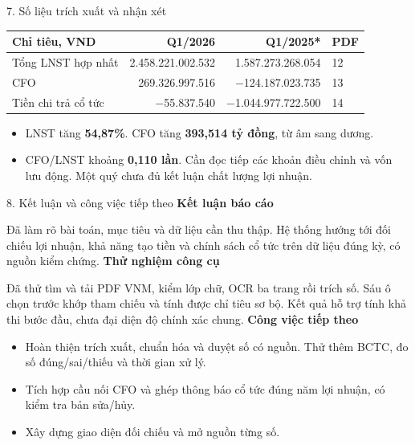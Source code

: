 \documentclass[t,aspectratio=169,11pt]{beamer}
\begin{document}
\begin{frame}{7. Số liệu trích xuất và nhận xét}
  {\small
  \setlength{\tabcolsep}{5pt}
  \renewcommand{\arraystretch}{1.25}
  \begin{tabular}{@{}p{3.5cm}rrp{1.1cm}@{}}
    \toprule
    \textbf{Chỉ tiêu, VND} & \textbf{Q1/2026} & \textbf{Q1/2025*} & \textbf{PDF}\\
    \midrule
    Tổng LNST hợp nhất & 2.458.221.002.532 & 1.587.273.268.054 & 12\\
    CFO & 269.326.997.516 & $-$124.187.023.735 & 13\\
    Tiền chi trả cổ tức & $-$55.837.540 & $-$1.044.977.722.500 & 14\\
    \bottomrule
  \end{tabular}}
  \vspace{0.4em}
  \begin{itemize}
    \item LNST tăng \textbf{54,87\%}. CFO tăng \textbf{393,514 tỷ đồng}, từ âm sang dương.
    \item CFO/LNST khoảng \textbf{0,110 lần}. Cần đọc tiếp các khoản điều chỉnh
      và vốn lưu động. Một quý chưa đủ kết luận chất lượng lợi nhuận.
  \end{itemize}

\end{frame}


\begin{frame}{8. Kết luận và công việc tiếp theo}
  \small
  \textbf{Kết luận báo cáo}
  \par Đã làm rõ bài toán, mục tiêu và dữ liệu cần thu thập.
  Hệ thống hướng tới đối chiếu lợi nhuận, khả năng tạo tiền và chính sách
  cổ tức trên dữ liệu đúng kỳ, có nguồn kiểm chứng.
  \vspace{0.3em}
  \textbf{Thử nghiệm công cụ}
  \par Đã thử tìm và tải PDF VNM, kiểm lớp chữ, OCR ba trang rồi trích số.
  Sáu ô chọn trước khớp tham chiếu và tính được chỉ tiêu sơ bộ.
  Kết quả hỗ trợ tính khả thi bước đầu, chưa đại diện độ chính xác chung.
  \vspace{0.3em}
  \textbf{Công việc tiếp theo}
  \begin{itemize}
    \item Hoàn thiện trích xuất, chuẩn hóa và duyệt số có nguồn.
      Thử thêm BCTC, đo số đúng/sai/thiếu và thời gian xử lý.
    \item Tích hợp cầu nối CFO và ghép thông báo cổ tức đúng năm lợi nhuận,
      có kiểm tra bản sửa/hủy.
    \item Xây dựng giao diện đối chiếu và mở nguồn từng số.
  \end{itemize}
\end{frame}
\end{document}
